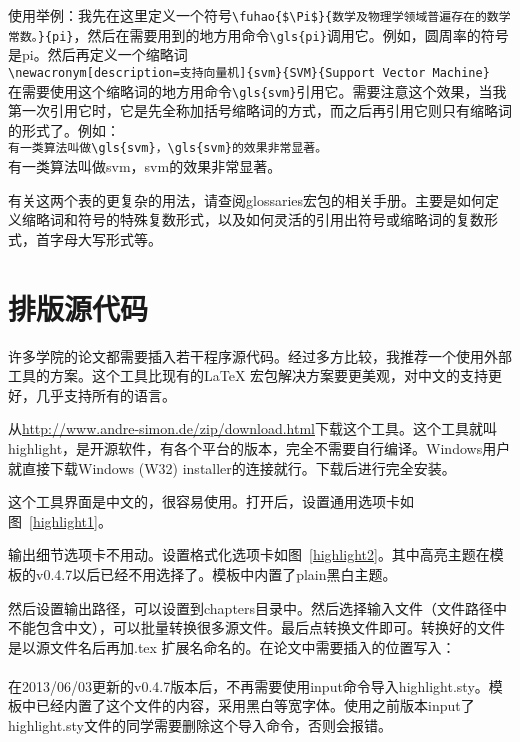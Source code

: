 使用举例：我先在这里定义一个符号\verb|\fuhao{$\Pi$}{数学及物理学领域普遍存在的数学常数。}{pi}|，然后在需要用到的地方用命令\verb|\gls{pi}|调用它。例如，圆周率的符号是\gls{pi}。然后再定义一个缩略词\\
\verb|\newacronym[description=支持向量机]{svm}{SVM}{Support Vector Machine}|\\
在需要使用这个缩略词的地方用命令\verb|\gls{svm}|引用它。需要注意这个效果，当我第一次引用它时，它是先全称加括号缩略词的方式，而之后再引用它则只有缩略词的形式了。例如：\\
\verb|有一类算法叫做\gls{svm}，\gls{svm}的效果非常显著。|\\
有一类算法叫做\gls{svm}，\gls{svm}的效果非常显著。

有关这两个表的更复杂的用法，请查阅glossaries宏包的相关手册。主要是如何定义缩略词和符号的特殊复数形式，以及如何灵活的引用出符号或缩略词的复数形式，首字母大写形式等。
\section{排版源代码}
\label{source:section}
许多学院的论文都需要插入若干程序源代码。经过多方比较，我推荐一个使用外部工具的方案。这个工具比现有的\LaTeX{} 宏包解决方案要更美观，对中文的支持更好，几乎支持所有的语言。

从\url{http://www.andre-simon.de/zip/download.html}下载这个工具。这个工具就叫highlight，是开源软件，有各个平台的版本，完全不需要自行编译。Windows用户就直接下载Windows (W32) installer的连接就行。下载后进行完全安装。

这个工具界面是中文的，很容易使用。打开后，设置通用选项卡如图~\ref{highlight1}。

输出细节选项卡不用动。设置格式化选项卡如图~\ref{highlight2}。其中高亮主题在模板的v0.4.7以后已经不用选择了。模板中内置了plain黑白主题。


然后设置输出路径，可以设置到chapters目录中。然后选择输入文件（文件路径中不能包含中文），可以批量转换很多源文件。最后点转换文件即可。转换好的文件是以源文件名后再加.tex 扩展名命名的。在论文中需要插入的位置写入：\\
\verb||\\
在2013/06/03更新的v0.4.7版本后，不再需要使用input命令导入highlight.sty。模板中已经内置了这个文件的内容，采用黑白等宽字体。使用之前版本input了highlight.sty文件的同学需要删除这个导入命令，否则会报错。

